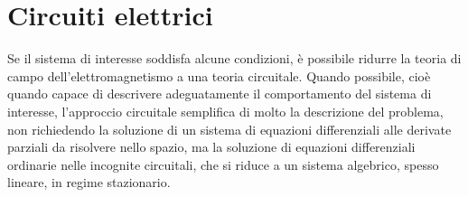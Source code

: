 \documentclass[letterpaper,10pt,italian]{jupyterBook}
\begin{document}
\section{Circuiti elettrici}
\label{\detokenize{ch/circuits-electric:circuiti-elettrici}}\label{\detokenize{ch/circuits-electric:classical-electromagnetism-circuits-electric}}\label{\detokenize{ch/circuits-electric::doc}}
\sphinxAtStartPar
Se il sistema di interesse soddisfa alcune condizioni, è possibile ridurre la teoria di campo dell’elettromagnetismo a una teoria circuitale.
Quando possibile, cioè quando capace di descrivere adeguatamente il comportamento del sistema di interesse, l’approccio circuitale semplifica di molto la descrizione del problema, non richiedendo la soluzione di un sistema di equazioni differenziali alle derivate parziali da risolvere nello spazio, ma la soluzione di equazioni differenziali ordinarie nelle incognite circuitali, che si riduce a un sistema algebrico, spesso lineare, in regime stazionario.

\sphinxAtStartPar
{}

\sphinxAtStartPar
{}

\sphinxstepscope
\end{document}
